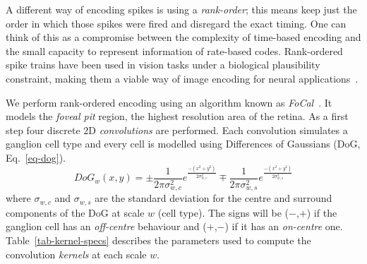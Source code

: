 A different way of encoding spikes is using a \emph{rank-order}; this means
keep just the order in which those spikes were fired and disregard the exact timing. One can think of this as a compromise between the complexity of time-based encoding and the small capacity to represent information of rate-based codes. Rank-ordered spike trains have been used in vision tasks under a biological plausibility constraint, making them a viable way of image encoding for neural applications~\cite{van-rullen-rate-coding,basab-model}.

We perform rank-ordered encoding using an algorithm known as 
\emph{FoCal}~\cite{basab-model}. It models the \emph{foveal pit} region, the highest resolution area of the retina. As a first step four discrete 2D \emph{convolutions} are performed. Each convolution simulates a ganglion cell type and every cell is modelled using Differences of Gaussians (DoG, Eq.~\ref{eq-dog}). 
\begin{equation}
\label{eq-dog}
DoG_w(x,y) = \pm\frac{1}{2\pi\sigma_{w,c}^2}e^{\frac{-(x^2 + y^2)}{2\sigma_{w,c}^2}}
\mp\frac{1}{2\pi\sigma_{w,s}^2}e^{\frac{-(x^2 + y^2)}{2\sigma_{w,s}^2}}
\end{equation}
where $\sigma_{w,c}$ and $\sigma_{w,s}$ are the standard deviation for the 
centre and surround components of the DoG at scale $w$ (cell type). The signs 
will be ($-$,$+$) if the ganglion cell has an \emph{off-centre} behaviour and 
($+$,$-$) if it has an \emph{on-centre} one. Table~\ref{tab-kernel-specs} 
describes the parameters used to compute the convolution \emph{kernels} at each 
scale $w$.

